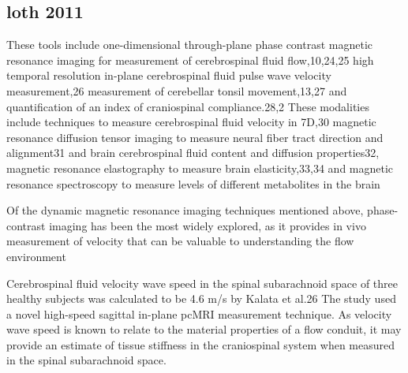 \documentclass{report}
\begin{document}
\subsection{loth 2011}
These
tools include one-dimensional through-plane phase
contrast magnetic resonance imaging for measurement
of cerebrospinal fluid flow,10,24,25 high temporal
resolution in-plane cerebrospinal fluid pulse wave
velocity measurement,26 measurement of cerebellar
tonsil movement,13,27 and quantification of an index
of craniospinal compliance.28,2
These modalities include techniques
to measure cerebrospinal fluid velocity in 7D,30
magnetic resonance diffusion tensor imaging to
measure neural fiber tract direction and alignment31
and brain cerebrospinal fluid content and diffusion
properties32, magnetic resonance elastography to
measure brain elasticity,33,34 and magnetic resonance
spectroscopy to measure levels of different metabolites
in the brain

Of the dynamic magnetic resonance imaging techniques
mentioned above, phase-contrast imaging has
been the most widely explored, as it provides in vivo
measurement of velocity that can be valuable to
understanding the flow environment

Cerebrospinal fluid velocity wave speed in the
spinal subarachnoid space of three healthy subjects
was calculated to be 4.6 m/s by Kalata et al.26 The
study used a novel high-speed sagittal in-plane
pcMRI measurement technique. As velocity wave
speed is known to relate to the material properties of
a flow conduit, it may provide an estimate of tissue
stiffness in the craniospinal system when measured in
the spinal subarachnoid space.
\end{document}

